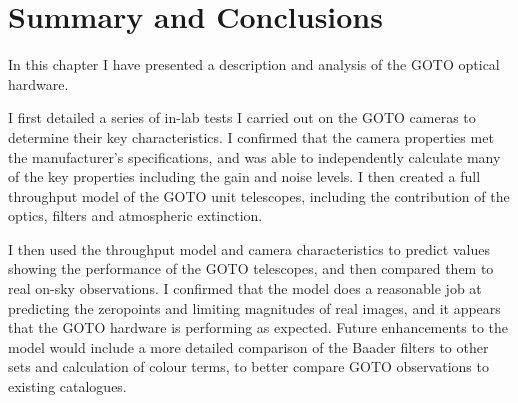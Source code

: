 
\section{Summary and Conclusions}
\label{sec:hardware_conclusion}


\begin{colsection}

In this chapter I have presented a description and analysis of the GOTO optical hardware.

I first detailed a series of in-lab tests I carried out on the GOTO cameras to determine their key characteristics. I confirmed that the camera properties met the manufacturer's specifications, and was able to independently calculate many of the key properties including the gain and noise levels. I then created a full throughput model of the GOTO unit telescopes, including the contribution of the optics, filters and atmospheric extinction.

I then used the throughput model and camera characteristics to predict values showing the performance of the GOTO telescopes, and then compared them to real on-sky observations. I confirmed that the model does a reasonable job at predicting the zeropoints and limiting magnitudes of real images, and it appears that the GOTO hardware is performing as expected. Future enhancements to the model would include a more detailed comparison of the Baader filters to other sets and calculation of colour terms, to better compare GOTO observations to existing catalogues.

\end{colsection}

